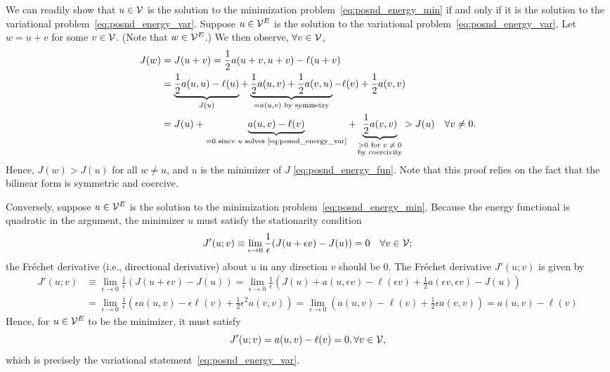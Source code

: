 We can readily show that $u \in \mathcal{V}$ is the solution to the minimization problem~\eqref{eq:posnd_energy_min} if and only if it is the solution to the variational problem~\eqref{eq:posnd_energy_var}. Suppose $u \in \mathcal{V}^E$ is the solution to the variational problem~\eqref{eq:posnd_energy_var}. Let $w = u + v$ for some $v \in \mathcal{V}$.  (Note that $w \in \mathcal{V}^E$.)  We then observe, $\forall v \in \mathcal{V}$,
\begin{align*}
  J(w)
  &=
  J(u+v)
  =
  \frac{1}{2} a(u+v,u+v) - \ell(u+v)
  \\
  &=
  \underbrace{\frac{1}{2} a(u,u) - \ell(u)}_{J(u)} + \underbrace{ \frac{1}{2} a(u,v) + \frac{1}{2} a(v,u)}_{= a(u,v) \text{ by symmetry}} - \ell(v) + \frac{1}{2} a(v,v)
  \\
  &=
  J(u) + \underbrace{ a(u,v) - \ell(v) }_{= 0 \text{ since $u$ solves \eqref{eq:posnd_energy_var}}} + \underbrace{ \frac{1}{2} a(v,v) }_{\substack{> 0 \text{ for $v \neq 0$}\\\text{by coercivity}}} > J(u) \quad \forall v \neq 0.
\end{align*}
Hence, $J(w) > J(u)$ for all $w \neq u$, and $u$ is the minimizer of $J$ \eqref{eq:posnd_energy_fun}.  Note that this proof relies on the fact that the bilinear form is symmetric and coercive.

Conversely, suppose $u \in \mathcal{V}^E$ is the solution to the minimization problem~\eqref{eq:posnd_energy_min}. Because the energy functional is quadratic in the argument, the minimizer $u$ must satisfy the stationarity condition
\begin{equation*}
  J'(u;v) \equiv \lim_{\epsilon \to 0} \frac{1}{\epsilon}(J(u+\epsilon v) - J(u)) = 0 \quad \forall v \in \mathcal{V};
\end{equation*}
the Fr\'echet derivative (i.e., directional derivative) about $u$ in any direction $v$ should be 0. The Fr\'echet derivative $J'(u;v)$ is given by
\begin{align*}
  J'(u;v)
  &\equiv
  \lim_{\epsilon \to 0} \frac{1}{\epsilon}(J(u+\epsilon v) - J(u))
  = \lim_{\epsilon \to 0} \frac{1}{\epsilon}(J(u) + a(u,\epsilon v) - \ell(\epsilon v) + \frac{1}{2} a(\epsilon v, \epsilon v) - J(u))
  \\
  &= \lim_{\epsilon \to 0} \frac{1}{\epsilon} (\epsilon a(u,v) - \epsilon \ell(v) + \frac{1}{2} \epsilon^2 a(v,v))
  = \lim_{\epsilon \to 0} (a(u,v) - \ell(v) + \frac{1}{2} \epsilon a(v,v))
  = a(u,v) - \ell(v) 
\end{align*}
Hence, for $u \in \mathcal{V}^E$ to be the minimizer, it must satisfy
\begin{equation*}
  J'(u;v) = a(u,v) - \ell(v) = 0, \forall v \in \mathcal{V},
\end{equation*}
which is precisely the variational statement~\eqref{eq:posnd_energy_var}.

